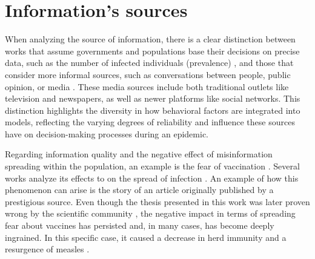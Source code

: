\section{Information's sources}
When analyzing the source of information, there is a clear distinction between works \cite{Vogiatzis2010} that assume governments and populations base their decisions on precise data, such as the number of infected individuals (prevalence) \cite{Collinson2014, Tyson_2020}, and those that consider more informal sources, such as conversations between people, public opinion, or media \cite{Bulai2023, Sontag2022}. These media sources include both traditional outlets like television and newspapers, as well as newer platforms like social networks.
This distinction highlights the diversity in how behavioral factors are integrated into models, reflecting the varying degrees of reliability and influence these sources have on decision-making processes during an epidemic.


Regarding information quality and the negative effect of misinformation spreading within the population, an example is the fear of vaccination \cite{Kahan_2013}. Several works analyze its effects to on the spread of infection \cite{Bauch_2012_game, Epstein_2021}.
An example of how this phenomenon can arise is the story of an article originally published by a prestigious source. Even though the thesis presented in this work was later proven wrong by the scientific community \cite{wakefield1998retracted}, the negative impact in terms of spreading fear about vaccines has persisted and, in many cases, has become deeply ingrained. In this specific case, it caused a decrease in herd immunity and a resurgence of measles \cite{Bauch_2012_overview}.

